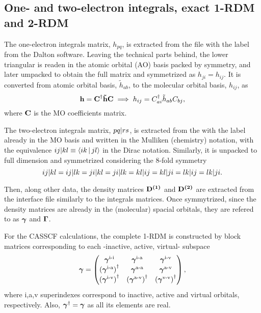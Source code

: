 \subsection{One- and two-electron integrals, exact 1-RDM and 2-RDM}

The one-electron integrals matrix, $h_{pq}$, is extracted from the 
 file with the  label from the Dalton
software.
Leaving the technical parts behind, the lower triangular is readen in the atomic
orbital (AO) basis packed by symmetry, and later umpacked to
obtain the full matrix and symmetrized as $h_{ji} = h_{ij}$.
It is converted from atomic orbital basis, $\tilde{h}_{ab}$, to the molecular
orbital basis, $h_{ij}$, as 
\begin{equation}
    \boldsymbol{\mathrm{h}} = \boldsymbol{\mathrm{C}}^{\dagger} \boldsymbol{\mathrm{\tilde{h}}} \boldsymbol{\mathrm{C}}
    \implies
    h_{ij} = C_{ai}^{\dagger} \tilde{h}_{ab} C_{bj},
\end{equation}
where $ \boldsymbol{\mathrm{C}}$ is the MO coefficients matrix.

The two-electron integrals matrix, $ \PBraket{pq | rs}$, is extracted from the
 with the  label already in the MO basis and
written in the Mulliken (chemistry) notation, with the equivalence
$ \PBraket{ij | kl} \equiv \Braket{ik | jl}$ in the Dirac notation.
Similarly, it is unpacked to full dimension and symmetrized considering the
8-fold symmetry
\begin{equation} \label{eq:spac-int-8fold}
    \PBraket{ij | kl} = 
    \PBraket{ij | lk} = 
    \PBraket{ji | kl} = 
    \PBraket{ji | lk} = 
    \PBraket{kl | ij} = 
    \PBraket{kl | ji} = 
    \PBraket{lk | ij} = 
    \PBraket{lk | ji}
    .
\end{equation}

Then, along other data, the density matrices $\boldsymbol{\mathrm{D^{\left( 1 \right)}}}$ and $\boldsymbol{\mathrm{D^{\left( 2 \right)}}}$ are
extracted from the interface  file similarly to the integrals
matrices.
Once symmytrized, since the density matrices are already in the (molecular)
spacial orbitals, they are refered to as $\boldsymbol{\mathrm{\gamma}}$ and $\boldsymbol{\mathrm{\Gamma}}$.

For the CASSCF calculations, the complete 1-RDM is constructed by block matrices
corresponding to each -inactive, active, virtual- subspace
\begin{equation} \label{eq:complete-cas-1rdm-1}
    \boldsymbol{\mathrm{\gamma}} =
    \begin{pmatrix}
        \boldsymbol{\mathrm{\gamma}}^{\text{i-i}} & \boldsymbol{\mathrm{\gamma}}^{\text{i-a}} & \boldsymbol{\mathrm{\gamma}}^{\text{i-v}} \\
        \left( \boldsymbol{\mathrm{\gamma}}^{\text{i-a}} \right)^{\dagger} & \boldsymbol{\mathrm{\gamma}}^{\text{a-a}} & \boldsymbol{\mathrm{\gamma}}^{\text{a-v}} \\
        \left( \boldsymbol{\mathrm{\gamma}}^{\text{i-v}} \right)^{\dagger} & \left( \boldsymbol{\mathrm{\gamma}}^{\text{a-v}} \right)^{\dagger} & \left( \boldsymbol{\mathrm{\gamma}}^{\text{v-v}} \right)^{\dagger} \\
    \end{pmatrix}
    ,
\end{equation}
where i,a,v superindexes correspond to inactive, active and virtual orbitals,
respectively.
Also, $\boldsymbol{\mathrm{\gamma}}^{\dagger} = \boldsymbol{\mathrm{\gamma}}$ as all its elements
are real.

